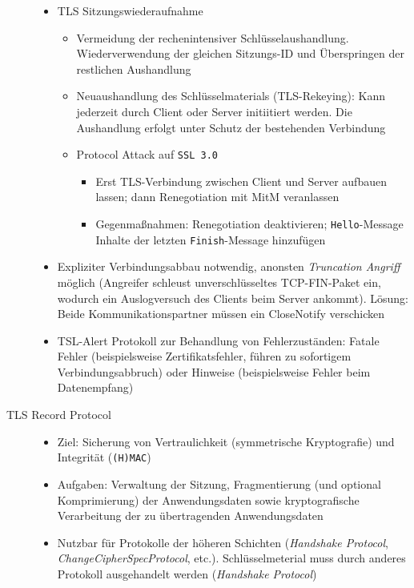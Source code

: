 \begin{description}
\begin{itemize}
\begin{itemize}
\begin{itemize}
			\end{itemize}
		\end{itemize}
		\item TLS Sitzungswiederaufnahme
		\begin{itemize}
			\item Vermeidung der rechenintensiver Schlüsselaushandlung. Wiederverwendung der gleichen Sitzungs-ID und Überspringen der restlichen Aushandlung
			\item Neuaushandlung des Schlüsselmaterials (TLS-Rekeying): Kann jederzeit durch Client oder Server initiitiert werden. Die Aushandlung erfolgt unter Schutz der bestehenden Verbindung
			\item Protocol Attack auf \texttt{SSL 3.0}
			\begin{itemize}
				\item Erst TLS-Verbindung zwischen Client und Server aufbauen lassen; dann Renegotiation mit MitM veranlassen
				\item Gegenmaßnahmen: Renegotiation deaktivieren; \texttt{Hello}-Message Inhalte der letzten \texttt{Finish}-Message hinzufügen
			\end{itemize}
		\end{itemize}
		\item Expliziter Verbindungsabbau notwendig, anonsten \textit{Truncation Angriff} möglich (Angreifer schleust unverschlüsseltes TCP-FIN-Paket ein, wodurch ein Auslogversuch des Clients beim Server ankommt). Lösung: Beide Kommunikationspartner müssen ein CloseNotify verschicken
		\item TSL-Alert Protokoll zur Behandlung von Fehlerzuständen: Fatale Fehler (beispielsweise Zertifikatsfehler, führen zu sofortigem Verbindungsabbruch) oder Hinweise (beispielsweise Fehler beim Datenempfang)
	\end{itemize}
	\item[TLS Record Protocol]\hfill
	\begin{itemize}
		\item Ziel: Sicherung von Vertraulichkeit (symmetrische Kryptografie) und Integrität (\texttt{(H)MAC})
		\item Aufgaben: Verwaltung der Sitzung, Fragmentierung (und optional Komprimierung) der Anwendungsdaten sowie kryptografische Verarbeitung der zu übertragenden Anwendungsdaten
		\item Nutzbar für Protokolle der höheren Schichten (\textit{Handshake Protocol}, \textit{ChangeCipherSpecProtocol}, etc.). Schlüsselmeterial muss durch anderes Protokoll ausgehandelt werden (\textit{Handshake Protocol})

\end{itemize}
\end{description}
